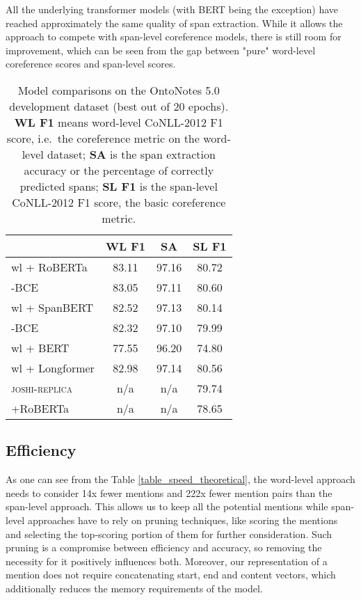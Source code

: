\documentclass[11pt]{article}
\begin{document}
All the underlying transformer models (with BERT being the exception) have reached approximately the same quality of span extraction. While it allows the approach to compete with span-level coreference models, there is still room for improvement, which can be seen from the gap between "pure" word-level coreference scores and span-level scores.
\begin{table} \centering
    \begin{tabular}{lccc}
        \hline
        & \textbf{WL F1} & \textbf{SA} & \textbf{SL F1} \\ \hline

        wl + RoBERTa                  & 83.11 & 97.16 & 80.72 \\
        \hspace{5pt} -BCE           & 83.05 & 97.11 & 80.60 \\
        wl + SpanBERT                 & 82.52 & 97.13 & 80.14 \\
        \hspace{5pt} -BCE           & 82.32 & 97.10 & 79.99 \\
        wl + BERT                     & 77.55 & 96.20 & 74.80 \\
        wl + Longformer               & 82.98 & 97.14 & 80.56 \\

        \hline

        \textsc{joshi-replica}      & n/a & n/a & 79.74 \\
        \hspace{5pt} +RoBERTa       & n/a & n/a & 78.65 \\

        \hline
    \end{tabular}
    \caption{Model comparisons on the OntoNotes 5.0 development dataset (best out of 20 epochs). \textbf{WL F1} means word-level CoNLL-2012 F1 score, i.e.\ the coreference metric on the word-level dataset; \textbf{SA} is the span extraction accuracy or the percentage of correctly predicted spans; \textbf{SL F1} is the span-level CoNLL-2012 F1 score, the basic coreference metric.}
    \label{table_dev}
\end{table}
 
\subsection{Efficiency} As one can see from the Table \ref{table_speed_theoretical}, the word-level approach needs to consider 14x fewer mentions and 222x fewer mention pairs than the span-level approach. This allows us to keep all the potential mentions while span-level approaches have to rely on pruning techniques, like scoring the mentions and selecting the top-scoring portion of them for further consideration. Such pruning is a compromise between efficiency and accuracy, so removing the necessity for it positively influences both. Moreover, our representation of a mention does not require concatenating start, end and content vectors, which additionally reduces the memory requirements of the model.
\end{document}
